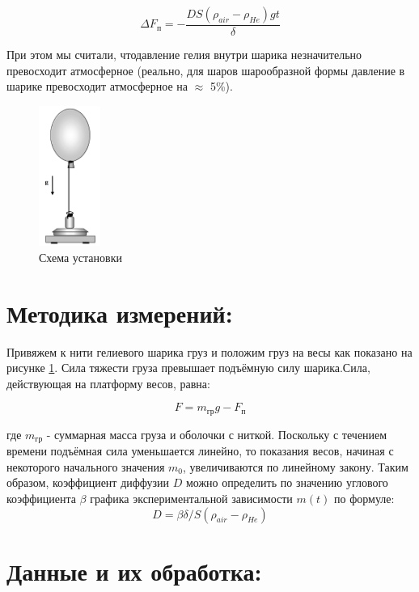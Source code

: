 \[\Delta F_п = - \frac{DS(\rho_{air} - \rho_{He})gt}{\delta}\]

При этом мы считали, чтодавление гелия внутри шарика незначительно превосходит атмосферное (реально, для шаров шарообразной формы давление в шарике превосходит атмосферное на $\approx$ 5\%).

\newpage

\begin{figure}
    \includegraphics[width=0.18\textwidth]{bal.png}
    \caption{Схема установки}
    \label{fig:bal}
\end{figure}

\section{Методика измерений:}

Привяжем к нити гелиевого шарика груз и положим груз на весы как показано на рисунке \ref{fig:bal}. Сила тяжести груза превышает подъёмную силу шарика.Сила, действующая на платформу весов, равна:

\[F = m_{гр}g - F_п\]

где $m_{гр}$ - суммарная масса груза и оболочки с ниткой.
Поскольку с течением времени подъёмная сила уменьшается линейно, то показания весов, начиная с некоторого начального значения $m_0$, увеличиваются по линейному закону. Таким образом, коэффициент диффузии $D$ можно определить по значению углового коэффициента $\beta$ графика экспериментальной зависимости $m(t)$ по формуле:
\[D = \beta \delta / S(\rho_{air} - \rho_{He})\]


\section{Данные и их обработка:}

